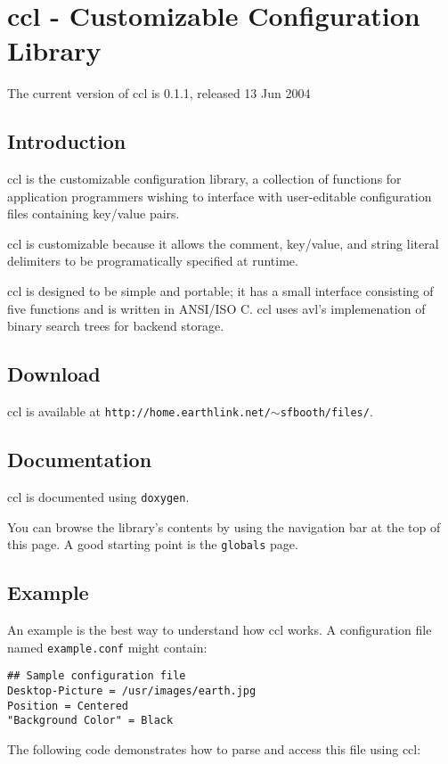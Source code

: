 \section{ccl - Customizable Configuration Library}\label{index}
 The current version of ccl is 0.1.1, released 13 Jun 2004 \subsection{Introduction}\label{index_section_introduction}
ccl is the customizable configuration library, a collection of functions for application programmers wishing to interface with user-editable configuration files containing key/value pairs.

ccl is customizable because it allows the comment, key/value, and string literal delimiters to be programatically specified at runtime.

ccl is designed to be simple and portable; it has a small interface consisting of five functions and is written in ANSI/ISO C. ccl uses avl's implemenation of binary search trees for backend storage.\subsection{Download}\label{index_section_download}
ccl is available at {\tt http://home.earthlink.net/$\sim$sfbooth/files/}.\subsection{Documentation}\label{index_section_documentation}
ccl is documented using {\tt doxygen}.

You can browse the library's contents by using the navigation bar at the top of this page. A good starting point is the {\tt globals} page.\subsection{Example}\label{index_section_example}
An example is the best way to understand how ccl works. A configuration file named {\tt example.conf} might contain:



\footnotesize\begin{verbatim}## Sample configuration file 
Desktop-Picture = /usr/images/earth.jpg 
Position = Centered 
"Background Color" = Black 
\end{verbatim}
\normalsize


The following code demonstrates how to parse and access this file using ccl:




